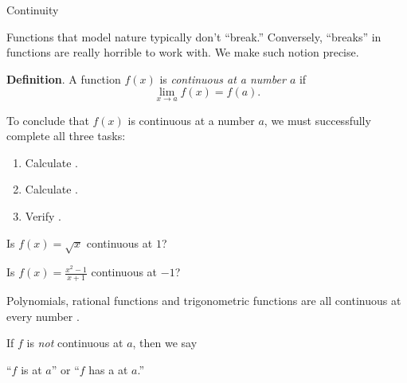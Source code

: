 \documentclass[../main.tex]{subfiles}
\begin{document}
\begin{lesson}{Continuity}

  Functions that model nature typically don't ``break.'' Conversely, ``breaks'' in functions are really horrible to work with. We make such notion precise. 

  \begin{mdframed}[style=withref]
    \textbf{Definition}. A function \(f(x)\) is \emph{continuous at a number \(a\)} if 
    \[
      {\lim_{x \to a} f(x) = f(a).}
    \]
  \end{mdframed}

  To conclude that \(f(x)\) is continuous at a number \(a\), we must successfully complete all three tasks:
  \begin{enumerate}[label=(C\arabic*), itemsep={2ex}]
    \item Calculate \underline{\hspace{3in}}.
    \item Calculate \underline{\hspace{3in}}.
    \item Verify \underline{\hspace{3.23in}}.
  \end{enumerate}

  \begin{example}
    Is \(f(x) = \sqrt{x}\) continuous at \(1\)? 

  \end{example}

  \begin{example}
    Is \(f(x) = \frac{x^{2}-1}{x+1}\) continuous at \(-1\)? 

  \end{example}

  \begin{mdframed}[style=withref-compact]
    Polynomials, rational functions and trigonometric functions are all continuous at every number \underline{\hspace{2in}}. 
    
  \end{mdframed}
  \clearpage


  If \(f\) is \emph{not} continuous at \(a\), then we say
  \begin{center}
    ``\(f\) is  at \(a\)'' \quad or \quad ``\(f\) has a  at \(a\).''
  \end{center}


\end{lesson}
\end{document}
